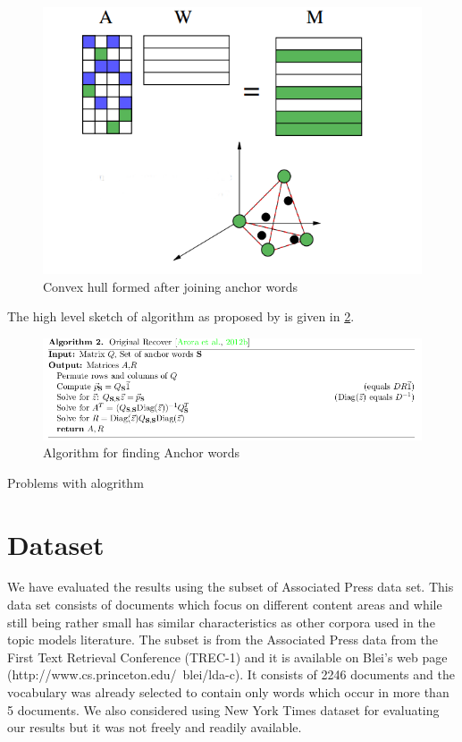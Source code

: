 \documentclass[a4paper,11pt]{article}
\begin{document}
\begin{figure}[htb]
\includegraphics[scale=0.4]{convexhull.png}
\caption{Convex hull formed after joining anchor words \cite{tm}}
\label{fig:convexhull}
\end{figure}
The high level sketch of algorithm as proposed by \cite{tm} is given in \ref{fig:algorithm}.

\begin{figure}[htb]
\includegraphics[scale=0.5]{algorithm.png}
\caption{Algorithm for finding Anchor words }
\label{fig:algorithm}
\end{figure}

{\color{orange}
Problems with alogrithm}

\section{Dataset}
We have evaluated the results using the subset of Associated Press data set. This data set consists of documents which focus on different content areas and while still being rather small has similar characteristics as other corpora used in the topic models literature. The subset is from the Associated Press data from the First Text Retrieval Conference (TREC-1) and it is available on Blei's web page (http://www.cs.princeton.edu/~blei/lda-c). It consists of 2246 documents and the vocabulary was already selected to contain only words which occur in more than 5 documents. We also considered using New York Times dataset for evaluating our results but it was not freely and readily available.
\end{document}
